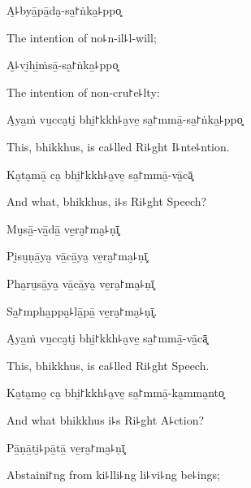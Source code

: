 A̮꜕byā̱pā̱da̮-sa̱꜓ṅka̱꜕ppo͓

\begin{english}
  The intention of no꜕n-il꜕l-will;
\end{english}

A̮꜕vi̮hi̱ṁsā̱-sa̱꜓ṅka̱꜕ppo͓

\begin{english}
  The intention of non-cru꜓e꜕lty:
\end{english}

A̮ya̱ṁ vu̱cca̮ti̮ bhi̱꜓kkh꜕a̮ve̱ sa̱꜓mmā̱-sa̱꜓ṅka̱꜕ppo͓

\begin{english}
  This, bhikkhus, is ca꜕lled Ri꜕ght I꜕nte꜕ntion.
\end{english}

Ka̮ta̮mā̱ ca̮ bhi̱꜓kkh꜕a̮ve̱ sa̱꜓mmā̱-vā̱cā͓

\begin{english}
  And what, bhikkhus, i꜕s Ri꜕ght Speech?
\end{english}

Mu̮sā̱-vā̱dā̱ ve̱ra̮꜓ma̮꜕ṇī͓


Pi̮su̮ṇā̱ya̮ vā̱cā̱ya̮ ve̱ra̮꜓ma̮꜕ṇī͓


Pha̮ru̮sā̱ya̮ vā̱cā̱ya̮ ve̱ra̮꜓ma̮꜕ṇī͓


Sa̱꜓mpha̱ppa̮꜕lā̱pā̱ ve̱ra̮꜓ma̮꜕ṇī͓.


\ifaivedition
\clearpage
\fi

A̮ya̱ṁ vu̱cca̮ti̮ bhi̱꜓kkh꜕a̮ve̱ sa̱꜓mmā̱-vā̱cā͓

\begin{english}
  This, bhikkhus, is ca꜕lled Ri꜕ght Speech.
\end{english}

Ka̮ta̮mo̱ ca̮ bhi̱꜓kkh꜕a̮ve̱ sa̱꜓mmā̱-ka̱mma̱nto͓

\begin{english}
  And what bhikkhus i꜕s Ri꜕ght A꜕ction?
\end{english}

Pā̱ṇā̱ti̮꜕pā̱tā̱ ve̱ra̮꜓ma̮꜕ṇī͓

\begin{english}
  Abstaini꜓ng from ki꜕lli꜕ng li꜕vi꜕ng be꜕ings;
\end{english}


